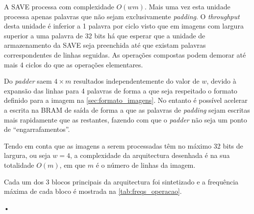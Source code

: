 \documentclass[a4paper]{article}
\begin{document}
A SAVE processa com complexidade $O(w m)$. Mais uma vez esta unidade processa apenas palavras que não sejam exclusivamente \textit{padding}. O \textit{throughput} desta unidade é inferior a 1 palavra por ciclo visto que em imagens com largura superior a uma palavra de 32 bits há que esperar que a unidade de armazenamento da SAVE seja preenchida até que existam palavras correspondentes de linhas seguidas. As operações compostas podem demorar até mais 4 ciclos do que as operações elementares.

Do \textit{padder} saem $4\times m$ resultados independentemente do valor de $w$, devido à expansão das linhas para 4 palavras de forma a que seja respeitado o formato definido para a imagem na \autoref{sec:formato_imagens}. No entanto é possível acelerar a escrita na BRAM de saída de forma a que as palavras de \textit{padding} sejam escritas mais rapidamente que as restantes, fazendo com que o \textit{padder} não seja um ponto de ``engarrafamentos''.

Tendo em conta que as imagens a serem processadas têm no máximo 32 bits de largura, ou seja $w=4$, a complexidade da arquitectura desenhada é na sua totalidade $O(m)$, em que $m$ é o número de linhas da imagem.

Cada um dos 3 blocos principais da arquitectura foi sintetizado e a frequência máxima de cada bloco é mostrada na \autoref{tab:freqs_operacao}.

\begin{table}
\centering
•
\caption{•}
\label{tab:freqs_operacao}
\end{table}




\end{document}
